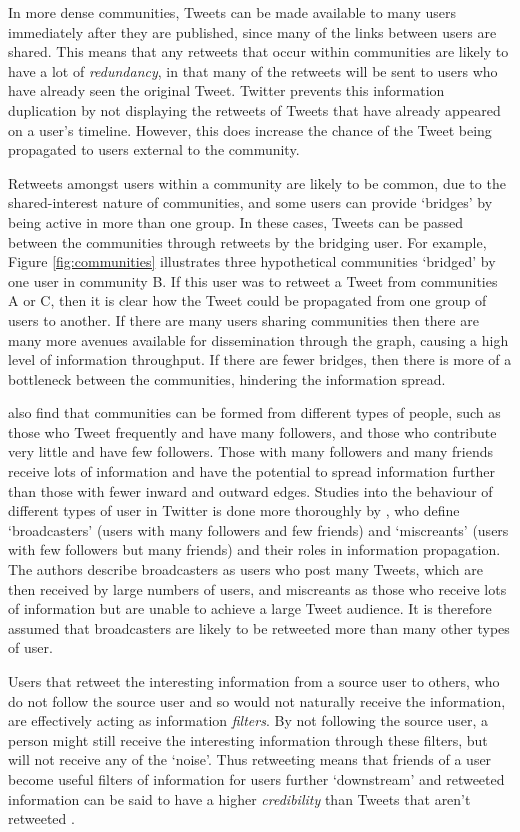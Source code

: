 In more dense communities, Tweets can be made available to many users immediately after they are published, since many of the links between users are shared. This means that any retweets that occur within communities are likely to have a lot of \textit{redundancy}, in that many of the retweets will be sent to users who have already seen the original Tweet. Twitter prevents this information duplication by not displaying the retweets of Tweets that have already appeared on a user's timeline. However, this does increase the chance of the Tweet being propagated to users external to the community.

Retweets amongst users within a community are likely to be common, due to the shared-interest nature of communities, and some users can provide `bridges' by being active in more than one group. In these cases, Tweets can be passed between the communities through retweets by the bridging user. For example, Figure \ref{fig:communities} illustrates three hypothetical communities `bridged' by one user in community B. If this user was to retweet a Tweet from communities A or C, then it is clear how the Tweet could be propagated from one group of users to another. If there are many users sharing communities then there are many more avenues available for dissemination through the graph, causing a high level of information throughput. If there are fewer bridges, then there is more of a bottleneck between the communities, hindering the information spread.

\citet{java07} also find that communities can be formed from different types of people, such as those who Tweet frequently and have many followers, and those who contribute very little and have few followers. Those with many followers and many friends receive lots of information and have the potential to spread information further than those with fewer inward and outward edges. Studies into the behaviour of different types of user in Twitter is done more thoroughly by \citet{krishnamurthy08}, who define `broadcasters' (users with many followers and few friends) and `miscreants' (users with few followers but many friends) and their roles in information propagation. The authors describe broadcasters as users who post many Tweets, which are then received by large numbers of users, and miscreants as those who receive lots of information but are unable to achieve a large Tweet audience. It is therefore assumed that broadcasters are likely to be retweeted more than many other types of user.

Users that retweet the interesting information from a source user to others, who do not follow the source user and so would not naturally receive the information, are effectively acting as information \textit{filters}. By not following the source user, a person might still receive the interesting information through these filters, but will not receive any of the `noise'. Thus retweeting means that friends of a user become useful filters of information for users further `downstream'  and retweeted information can be said to have a higher \textit{credibility} than Tweets that aren't retweeted \cite{castillo11}.


